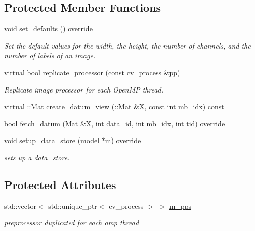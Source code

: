 \subsection*{Protected Member Functions}
\begin{DoxyCompactItemize}
\item 
void \hyperlink{classlbann_1_1imagenet__reader_ad1e108315d659509a3e166c2f8a4941f}{set\+\_\+defaults} () override
\begin{DoxyCompactList}\small\item\em Set the default values for the width, the height, the number of channels, and the number of labels of an image. \end{DoxyCompactList}\item 
virtual bool \hyperlink{classlbann_1_1imagenet__reader_a1b642b5eb01b209e72bdd8dfa139cafd}{replicate\+\_\+processor} (const cv\+\_\+process \&pp)
\begin{DoxyCompactList}\small\item\em Replicate image processor for each Open\+MP thread. \end{DoxyCompactList}\item 
virtual \+::\hyperlink{base_8hpp_a68f11fdc31b62516cb310831bbe54d73}{Mat} \hyperlink{classlbann_1_1imagenet__reader_a5c0662ebaa378f7f5b4448f4d207e872}{create\+\_\+datum\+\_\+view} (\+::\hyperlink{base_8hpp_a68f11fdc31b62516cb310831bbe54d73}{Mat} \&X, const int mb\+\_\+idx) const
\item 
bool \hyperlink{classlbann_1_1imagenet__reader_a6659e90c0243da40f214a877f65eb8ac}{fetch\+\_\+datum} (\hyperlink{base_8hpp_a68f11fdc31b62516cb310831bbe54d73}{Mat} \&X, int data\+\_\+id, int mb\+\_\+idx, int tid) override
\item 
void \hyperlink{classlbann_1_1imagenet__reader_a17af38eff1c3aee001d263248b8406a1}{setup\+\_\+data\+\_\+store} (\hyperlink{classlbann_1_1model}{model} $\ast$m) override
\begin{DoxyCompactList}\small\item\em sets up a data\+\_\+store. \end{DoxyCompactList}\end{DoxyCompactItemize}
\subsection*{Protected Attributes}
\begin{DoxyCompactItemize}
\item 
std\+::vector$<$ std\+::unique\+\_\+ptr$<$ cv\+\_\+process $>$ $>$ \hyperlink{classlbann_1_1imagenet__reader_a1e0d0ed4ac529de3e9f735512f5e3dd8}{m\+\_\+pps}
\begin{DoxyCompactList}\small\item\em preprocessor duplicated for each omp thread \end{DoxyCompactList}\end{DoxyCompactItemize}
